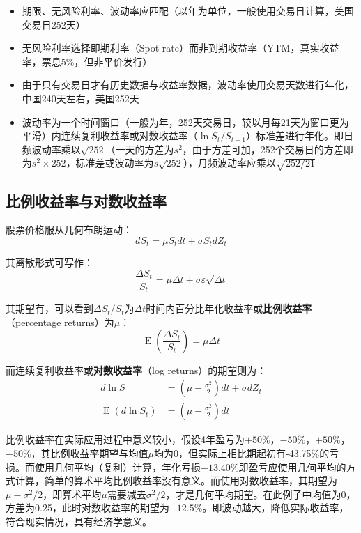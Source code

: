 \documentclass[11pt]{article}
\newcommand{\E}{\operatorname{E}}
\begin{document}
\begin{itemize}
    \item 期限、无风险利率、波动率应匹配（以年为单位，一般使用交易日计算，美国交易日252天）
    \item 无风险利率选择即期利率（Spot rate）而非到期收益率（YTM，真实收益率，票息5\%，但非平价发行）
    \item 由于只有交易日才有历史数据与收益率数据，波动率使用交易天数进行年化，中国240天左右，美国252天
    \item 波动率为一个时间窗口（一般为年，252天交易日，较以月每21天为窗口更为平滑）内连续复利收益率或对数收益率（$\ln S_t/S_{t-1}$）标准差进行年化。即日频波动率乘以$\sqrt{252}$（一天的方差为$s^2$，由于方差可加，252个交易日的方差即为$s^2 \times 252$，标准差或波动率为$s\sqrt{252}$），月频波动率应乘以$\sqrt{252/21}$
\end{itemize}

\subsection{比例收益率与对数收益率}

股票价格服从几何布朗运动：
\begin{equation*}
    dS_t = \mu S_t dt + \sigma S_t dZ_t
\end{equation*}

其离散形式可写作：
\begin{equation*}
    \frac{\Delta S_t}{S_t} = \mu \Delta t + \sigma \varepsilon \sqrt{\Delta t}
\end{equation*}

其期望有，可以看到$\Delta S_t/S_t$为$\Delta t$时间内百分比年化收益率或\textbf{比例收益率}（percentage returns）为$\mu$：
\begin{equation*}
    \E(\frac{\Delta S_t}{S_t}) = \mu \Delta t
\end{equation*}

而连续复利收益率或\textbf{对数收益率}（log returns）的期望则为：
\begin{align*}
    d\ln S       & = (\mu-\frac{\sigma^2}{2})dt+\sigma dZ_t \\
    \E(d\ln S_t) & = (\mu - \frac{\sigma^2}{2})dt
\end{align*}

比例收益率在实际应用过程中意义较小，假设4年盈亏为$+50\%$，$-50\%$，$+50\%$，$-50\%$，其比例收益率期望与均值$\mu$均为0，但实际上相比期起初有-43.75\%的亏损。而使用几何平均（复利）计算，年化亏损$-13.40\%$即盈亏应使用几何平均的方式计算，简单的算术平均比例收益率没有意义。而使用对数收益率，其期望为$\mu-\sigma^2/2$，即算术平均$\mu$需要减去$\sigma^2/2$，才是几何平均期望。在此例子中均值为0，方差为0.25，此时对数收益率的期望为$-12.5\%$。即波动越大，降低实际收益率，符合现实情况，具有经济学意义。
\end{document}
